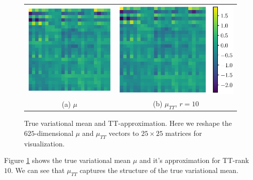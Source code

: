 \begin{figure}[!h]
  \begin{center}
      \begin{tabular}{cc}
          \includegraphics[trim = 80 0 80 0, clip, height=0.4\linewidth]{pics/true.eps} &
        \hspace{0.5cm}\includegraphics[trim = 80 0 0 0, clip, height=0.4\linewidth]{pics/tt.eps} \\
          (a) $\mu$ &
          (b) $\mu_{TT}$, $r = 10$
      \end{tabular}
  \end{center}
  \caption{True variational mean and TT-approximation. Here we reshape the 
    $625$-dimensional $\mu$ and $\mu_{TT}$ vectors
    to $25 \times 25$ matrices for visualization.}
  \label{true_and_tt}
\end{figure}

Figure \ref{true_and_tt} shows the true variational mean $\mu$ and it's 
approximation for TT-rank $10$.  We can see that $\mu_{TT}$ captures the 
structure of the true variational mean.

